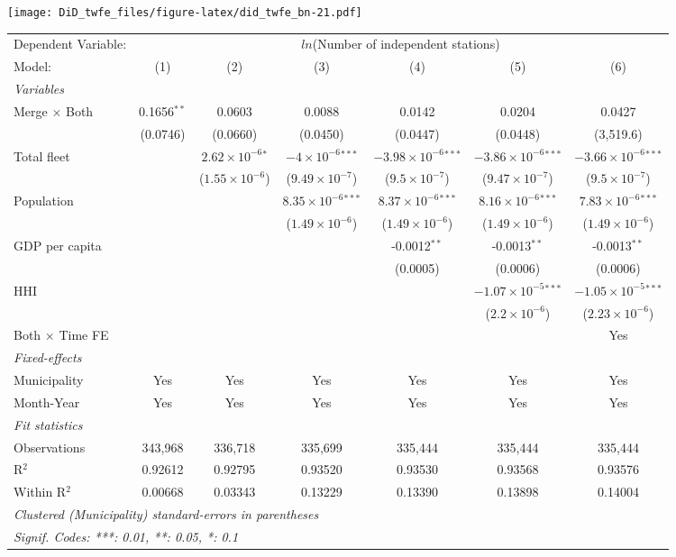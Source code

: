 \documentclass[
]{article}
\begin{document}
\texttt{[image: DiD\_twfe\_files/figure-latex/did\_twfe\_bn-21.pdf]}

\begin{tabular}{lcccccc}
\tabularnewline\midrule\midrule
Dependent Variable:&\multicolumn{6}{c}{$ln$(Number of independent stations)}\\
Model:&(1) & (2) & (3) & (4) & (5) & (6)\\
\midrule \emph{Variables}&   &   &   &   &   &  \\
Merge $\times $ Both & 0.1656$^{**}$ & 0.0603 & 0.0088 & 0.0142 & 0.0204 & 0.0427\\
  &(0.0746) & (0.0660) & (0.0450) & (0.0447) & (0.0448) & (3,519.6)\\
Total fleet &    & $2.62\times 10^{-6}$$^{*}$ & $-4\times 10^{-6}$$^{***}$ & $-3.98\times 10^{-6}$$^{***}$ & $-3.86\times 10^{-6}$$^{***}$ & $-3.66\times 10^{-6}$$^{***}$\\
  &   & ($1.55\times 10^{-6}$) & ($9.49\times 10^{-7}$) & ($9.5\times 10^{-7}$) & ($9.47\times 10^{-7}$) & ($9.5\times 10^{-7}$)\\
Population &    &    & $8.35\times 10^{-6}$$^{***}$ & $8.37\times 10^{-6}$$^{***}$ & $8.16\times 10^{-6}$$^{***}$ & $7.83\times 10^{-6}$$^{***}$\\
  &   &    & ($1.49\times 10^{-6}$) & ($1.49\times 10^{-6}$) & ($1.49\times 10^{-6}$) & ($1.49\times 10^{-6}$)\\
GDP per capita &    &    &    & -0.0012$^{**}$ & -0.0013$^{**}$ & -0.0013$^{**}$\\
  &   &    &    & (0.0005) & (0.0006) & (0.0006)\\
HHI &    &    &    &    & $-1.07\times 10^{-5}$$^{***}$ & $-1.05\times 10^{-5}$$^{***}$\\
  &   &    &    &    & ($2.2\times 10^{-6}$) & ($2.23\times 10^{-6}$)\\
Both $\times$ Time FE &  &  &  &  &  & Yes\\
\midrule \emph{Fixed-effects}&   &   &   &   &   &  \\
Municipality & Yes & Yes & Yes & Yes & Yes & Yes\\
Month-Year & Yes & Yes & Yes & Yes & Yes & Yes\\
\midrule \emph{Fit statistics}&  & & & & & \\
Observations & 343,968&336,718&335,699&335,444&335,444&335,444\\
R$^2$ & 0.92612&0.92795&0.93520&0.93530&0.93568&0.93576\\
Within R$^2$ & 0.00668&0.03343&0.13229&0.13390&0.13898&0.14004\\
\midrule\midrule\multicolumn{7}{l}{\emph{Clustered (Municipality) standard-errors in parentheses}}\\
\multicolumn{7}{l}{\emph{Signif. Codes: ***: 0.01, **: 0.05, *: 0.1}}\\
\end{tabular}
\end{document}
